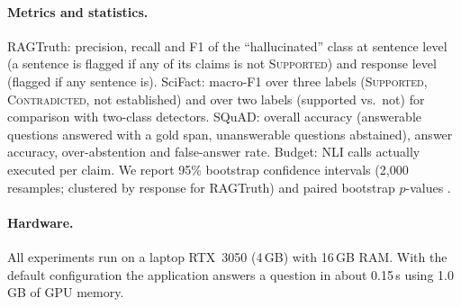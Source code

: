 \paragraph{Metrics and statistics.}
RAGTruth: precision, recall and F1 of the ``hallucinated'' class at sentence level (a sentence is flagged if any of its claims is not \textsc{Supported}) and response level (flagged if any sentence is).
SciFact: macro-F1 over three labels (\textsc{Supported}, \textsc{Contradicted}, not established) and over two labels (supported vs.\ not) for comparison with two-class detectors.
SQuAD: overall accuracy (answerable questions answered with a gold span, unanswerable questions abstained), answer accuracy, over-abstention and false-answer rate.
Budget: NLI calls actually executed per claim.
We report 95\% bootstrap confidence intervals (2{,}000 resamples; clustered by response for RAGTruth) and paired bootstrap $p$-values \citep{bergkirkpatrick2012significance}.

\paragraph{Hardware.}
All experiments run on a laptop RTX~3050 (4\,GB) with 16\,GB RAM. With the default configuration the application answers a question in about 0.15\,s using 1.0\,GB of GPU memory.
